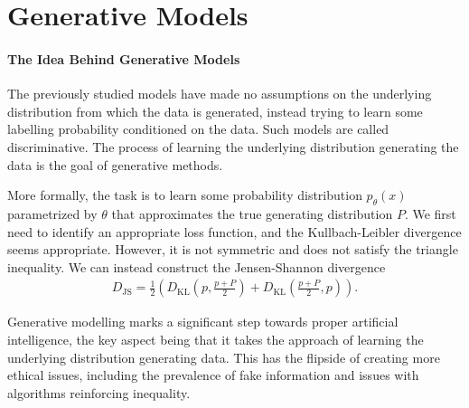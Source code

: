 \section{Generative Models}

\paragraph{The Idea Behind Generative Models}
The previously studied models have made no assumptions on the underlying distribution from which the data is generated, instead trying to learn some labelling probability conditioned on the data. Such models are called discriminative. The process of learning the underlying distribution generating the data is the goal of generative methods.

More formally, the task is to learn some probability distribution $p_{\theta}(x)$ parametrized by $\theta$ that approximates the true generating distribution $P$. We first need to identify an appropriate loss function, and the Kullbach-Leibler divergence seems appropriate. However, it is not symmetric and does not satisfy the triangle inequality. We can instead construct the Jensen-Shannon divergence
\begin{align*}
	D_{\text{JS}} = \frac{1}{2}\left(D_{\text{KL}}\left(p, \frac{p + P}{2}\right) + D_{\text{KL}}\left(\frac{p + P}{2}, p\right)\right).
\end{align*}

Generative modelling marks a significant step towards proper artificial intelligence, the key aspect being that it takes the approach of learning the underlying distribution generating data. This has the flipside of creating more ethical issues, including the prevalence of fake information and issues with algorithms reinforcing inequality.

